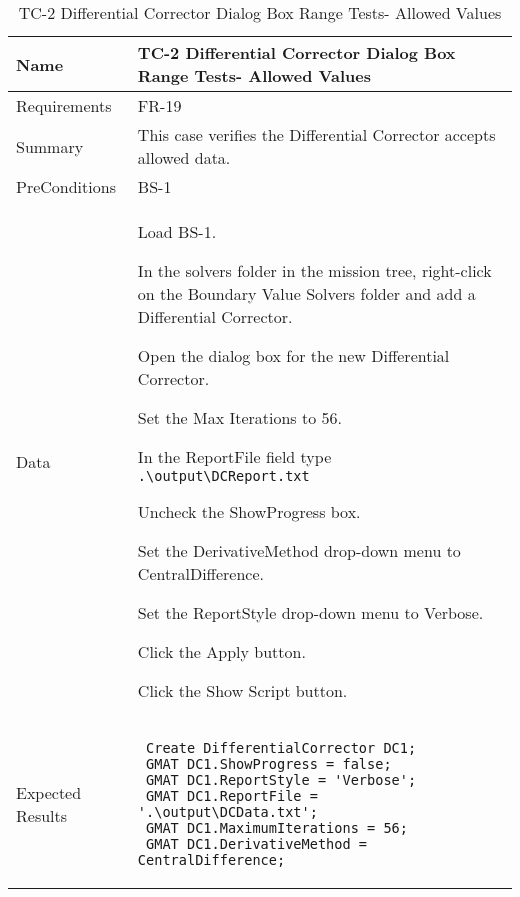 

\begin{table}[htbp!]
\centering
      \begin{tabular}{|p{1.05 in} |p{4.75 in} |}
      \hline
         \rowcolor[rgb]{0.8,0.8,0.8} Name & TC-2 Differential Corrector Dialog Box Range Tests- Allowed Values\\
         \hline
         Requirements & FR-19\\  \hline
         Summary &
         This case verifies the Differential Corrector accepts allowed data.
         \\     \hline
         PreConditions & BS-1\\     \hline
         Data &
         \begin{compactenum}
             \item Load BS-1.
             \item In the solvers folder in the mission tree, right-click on the Boundary Value Solvers folder and add a Differential Corrector.
             \item Open the dialog box for the new Differential Corrector.
             \item Set the Max Iterations to 56.
             \item In the ReportFile field type \verb".\output\DCReport.txt"
             \item Uncheck the ShowProgress box.
             \item Set the DerivativeMethod drop-down menu to CentralDifference.
             \item Set the ReportStyle drop-down menu to Verbose.
             \item Click the Apply button.
             \item Click the Show Script button.
         \end{compactenum}
         \\ \hline
         Expected Results &
             \begin{verbatim}
 Create DifferentialCorrector DC1;
 GMAT DC1.ShowProgress = false;
 GMAT DC1.ReportStyle = 'Verbose';
 GMAT DC1.ReportFile = '.\output\DCData.txt';
 GMAT DC1.MaximumIterations = 56;
 GMAT DC1.DerivativeMethod = CentralDifference;
             \end{verbatim}
         \\   \hline
      \end{tabular}
      \label{Table:TC-2}
      \caption{TC-2 Differential Corrector Dialog Box Range Tests- Allowed Values}
\end{table} 